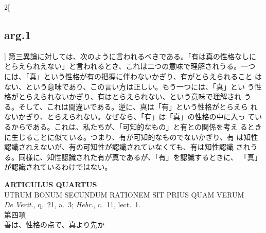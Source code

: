 \documentclass[paper=a4paper,fontsize=10pt,jafontsize=9pt,titlepage]{jlreq}
\begin{document}
\begin{paracol}{2}[\subsection{arg.1}]
第三異論に対しては、次のように言われるべきである。「有は真の性格なしに
とらえられえない」と言われるとき、これは二つの意味で理解されうる。一つ
には、「真」という性格が有の把握に伴わないかぎり、有がとらえられること
はない、という意味であり、この言い方は正しい。もう一つには、「真」とい
う性格がとらえられないかぎり、有はとらえられない、という意味で理解され
うる。そして、これは間違いである。逆に、真は「有」という性格がとらえら
れないかぎり、とらえられない。なぜなら、「有」は「真」の性格の中に入っ
ているからである。これは、私たちが、「可知的なもの」と有との関係を考え
るときに生じることに似ている。つまり、有が可知的なものでないかぎり、有
は知性認識されえないが、有の可知性が認識されていなくても、有は知性認識
されうる。同様に、知性認識された有が真であるが、「有」を認識するときに、
「真」が認識されているわけではない。

\end{paracol}
\newpage


{}
\setcounter{section}{4}
\setcounter{subsection}{0}
\begin{center}
 {\Large {\bfseries ARTICULUS QUARTUS}}\\
 {\large UTRUM BONUM SECUNDUM RATIONEM SIT PRIUS QUAM VERUM}\\
 {\footnotesize {\itshape De Verit.}, q.~21, a.~3; {\itshape Hebr.},
 c.~11, lect.~1.}\\
 {\Large 第四項\\善は、性格の点で、真より先か}
\end{center}
\end{document}

